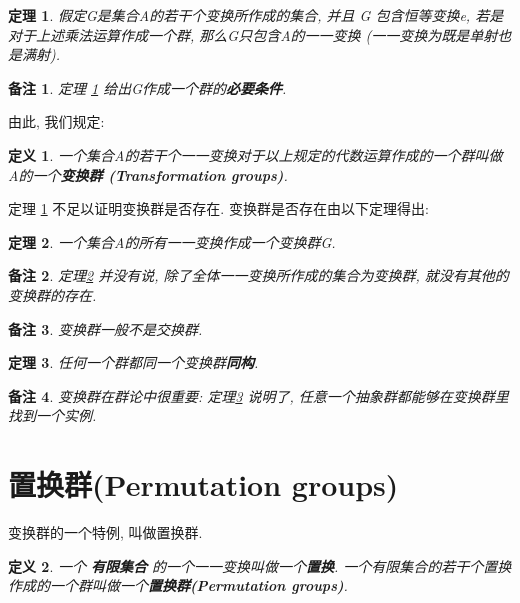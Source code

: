 \documentclass[utf8]{ctexbook}
\newtheorem{theorem}{定理}[section]
\newtheorem{definition}{定义}[section]
\newtheorem{memo}{备注}[section]
\begin{document}
\begin{theorem}
假定G是集合A的若干个变换所作成的集合, 并且 G 包含恒等变换e, 若是对于上述乘法运算作成一个群, 那么G只包含A的一一变换 (一一变换为既是单射也是满射). \label{thm_tau_group_nec_condition}
\end{theorem}

\begin{memo}
 定理 \ref{thm_tau_group_nec_condition} 给出G作成一个群的\textbf{必要条件}.
\end{memo}

由此, 我们规定:
\begin{definition}\label{def_transformation_group}
一个集合A的若干个一一变换对于以上规定的代数运算作成的一个群叫做A的一个\textbf{变换群 (Transformation groups)}.
\end{definition}

定理 \ref{thm_tau_group_nec_condition} 不足以证明变换群是否存在. 变换群是否存在由以下定理得出:

\begin{theorem}\label{thm_oneone_tau_group}
一个集合A的所有一一变换作成一个变换群G. 
\end{theorem}

\begin{memo}
定理\ref{thm_oneone_tau_group} 并没有说, 除了全体一一变换所作成的集合为变换群, 就没有其他的变换群的存在.
\end{memo}

\begin{memo}
变换群一般不是交换群. 
\end{memo}

\begin{theorem}\label{thm_all_groups_map_to_tau_group}
任何一个群都同一个变换群\textbf{同构}.
\end{theorem}
\begin{memo}
变换群在群论中很重要: 定理\ref{thm_all_groups_map_to_tau_group} 说明了, 任意一个抽象群都能够在变换群里找到一个实例.
\end{memo}


\section{置换群(Permutation groups)}

变换群的一个特例, 叫做置换群.

\begin{definition}\label{def_permutation_groups}
一个 \textbf{有限集合} 的一个一一变换叫做一个\textbf{置换}. 一个有限集合的若干个置换作成的一个群叫做一个\textbf{置换群(Permutation groups)}.
\end{definition}
\end{document}
